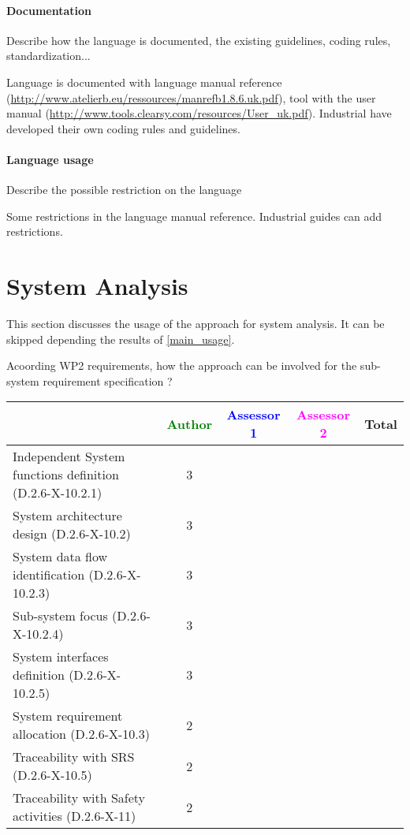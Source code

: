 \paragraph{Documentation} Describe how the language is documented, the existing guidelines, coding rules, standardization...

\begin{author_comment}

Language is documented with language manual reference (\url{http://www.atelierb.eu/ressources/manrefb1.8.6.uk.pdf}), tool with the user manual (\url{http://www.tools.clearsy.com/resources/User_uk.pdf}). Industrial have developed their own coding rules and guidelines.
\end{author_comment}


\paragraph{Language usage} Describe the possible restriction on the language
\begin{author_comment}
Some restrictions in the language manual reference. Industrial guides can add restrictions.
\end{author_comment}

\section{System Analysis}
This section discusses the usage of the approach for system analysis.
It can be skipped depending the results of \ref{main_usage}.

Acoording WP2 requirements, how the approach can be involved for the sub-system requirement specification ?

\begin{tabular}{|l | c | c | c | c|}
\hline
& \textcolor{green}{Author} & \textcolor{blue}{Assessor 1} & \textcolor{magenta}{Assessor 2} & Total \\
\hline
Independent System functions definition (D.2.6-X-10.2.1)  & 3 & & &  \\
\hline 
System architecture design (D.2.6-X-10.2) & 3 & & &  \\
\hline
System data flow identification (D.2.6-X-10.2.3)  & 3 & & &  \\
\hline
Sub-system focus (D.2.6-X-10.2.4)  & 3 & & &  \\
\hline
System interfaces definition (D.2.6-X-10.2.5)  & 3 & & &  \\
\hline
System requirement allocation (D.2.6-X-10.3)  & 2 & & &  \\
\hline
Traceability with SRS (D.2.6-X-10.5)  & 2 & & &  \\
\hline
Traceability with Safety activities (D.2.6-X-11)  & 2 & & &  \\
\hline
\end{tabular}

